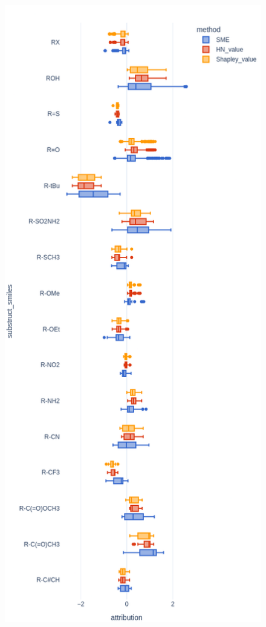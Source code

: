 \documentclass[twoside,twocolumn,9pt]{article}
\begin{document}
\begin{figure}[H]
    \centering
    \includegraphics[scale=0.5]{../data/images/esol_attribution_distributions_vertical.png}
\end{figure}
\end{document}
